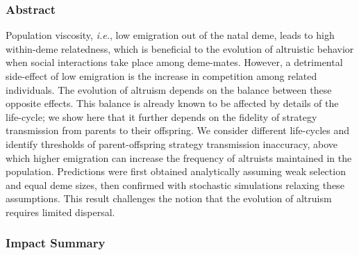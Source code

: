 \documentclass[11pt, letterpaper]{article}
\newcommand{\ie}{\textit{i.e.}}
\begin{document}
\linenumbers
\subsubsection*{Abstract}
\doublespacing
Population viscosity, \ie, low emigration out of the natal deme, leads to high within-deme relatedness, which is beneficial to the evolution of altruistic behavior when social interactions take place among deme-mates. However, a detrimental side-effect of low emigration is the increase in competition among related individuals. The evolution of altruism depends on the balance between these opposite effects. This balance is already known to be affected by details of the life-cycle; we show here that it further depends on the fidelity of strategy transmission from parents to their offspring. We consider different life-cycles and identify thresholds of parent-offspring strategy transmission inaccuracy, above which higher emigration can increase the frequency of altruists maintained in the population. Predictions were first obtained analytically assuming weak selection and equal deme sizes, then confirmed with stochastic simulations relaxing these assumptions. This result challenges the notion that the evolution of altruism requires limited dispersal. 

\clearpage
\subsubsection*{Impact Summary}
\end{document}
